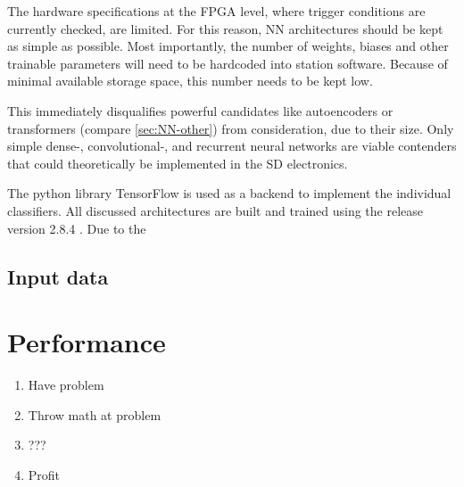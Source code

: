 The hardware specifications at the FPGA level, where trigger conditions are currently checked, are limited. For this reason, NN architectures should be kept as 
simple as possible. Most importantly, the number of weights, biases and other trainable parameters will need to be hardcoded into station software. Because of 
minimal available storage space, this number needs to be kept low.

This immediately disqualifies powerful candidates like autoencoders or transformers (compare \autoref{sec:NN-other}) from consideration, due to their size. Only 
simple dense-, convolutional-, and recurrent neural networks are viable contenders that could theoretically be implemented in the SD electronics.

The python library TensorFlow \cite{tensorflow2015-whitepaper} is used as a backend to implement the individual classifiers. All discussed architectures are built 
and trained using the release version 2.8.4 \cite{tensorflowversion}. Due to the 

\subsection{Input data}
\label{ssec:input-data}



\section{Performance}

\begin{enumerate}
    \item Have problem
    \item Throw math at problem
    \item ???
    \item Profit
\end{enumerate}


